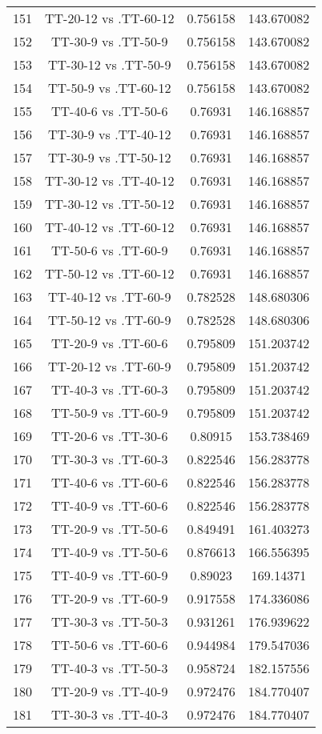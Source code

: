 \documentclass[a4paper,10pt]{article}
\begin{document}
\begin{landscape}
\begin{table}[!htp]
\begin{tabular}{cccc}
151&TT-20-12 vs .TT-60-12&0.756158&143.670082\\
152&TT-30-9 vs .TT-50-9&0.756158&143.670082\\
153&TT-30-12 vs .TT-50-9&0.756158&143.670082\\
154&TT-50-9 vs .TT-60-12&0.756158&143.670082\\
155&TT-40-6 vs .TT-50-6&0.76931&146.168857\\
156&TT-30-9 vs .TT-40-12&0.76931&146.168857\\
157&TT-30-9 vs .TT-50-12&0.76931&146.168857\\
158&TT-30-12 vs .TT-40-12&0.76931&146.168857\\
159&TT-30-12 vs .TT-50-12&0.76931&146.168857\\
160&TT-40-12 vs .TT-60-12&0.76931&146.168857\\
161&TT-50-6 vs .TT-60-9&0.76931&146.168857\\
162&TT-50-12 vs .TT-60-12&0.76931&146.168857\\
163&TT-40-12 vs .TT-60-9&0.782528&148.680306\\
164&TT-50-12 vs .TT-60-9&0.782528&148.680306\\
165&TT-20-9 vs .TT-60-6&0.795809&151.203742\\
166&TT-20-12 vs .TT-60-9&0.795809&151.203742\\
167&TT-40-3 vs .TT-60-3&0.795809&151.203742\\
168&TT-50-9 vs .TT-60-9&0.795809&151.203742\\
169&TT-20-6 vs .TT-30-6&0.80915&153.738469\\
170&TT-30-3 vs .TT-60-3&0.822546&156.283778\\
171&TT-40-6 vs .TT-60-6&0.822546&156.283778\\
172&TT-40-9 vs .TT-60-6&0.822546&156.283778\\
173&TT-20-9 vs .TT-50-6&0.849491&161.403273\\
174&TT-40-9 vs .TT-50-6&0.876613&166.556395\\
175&TT-40-9 vs .TT-60-9&0.89023&169.14371\\
176&TT-20-9 vs .TT-60-9&0.917558&174.336086\\
177&TT-30-3 vs .TT-50-3&0.931261&176.939622\\
178&TT-50-6 vs .TT-60-6&0.944984&179.547036\\
179&TT-40-3 vs .TT-50-3&0.958724&182.157556\\
180&TT-20-9 vs .TT-40-9&0.972476&184.770407\\
181&TT-30-3 vs .TT-40-3&0.972476&184.770407\\

\end{tabular}
\end{table}
\end{landscape}
\end{document}
